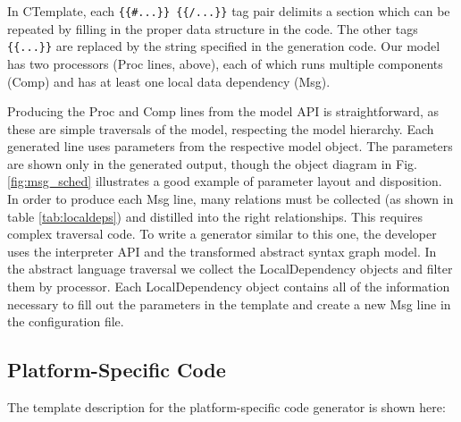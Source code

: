In CTemplate, each \verb${{#...}} {{/...}}$ tag pair delimits a section which
can be repeated by filling in the proper data structure in the code.  The other
tags \verb${{...}}$ are replaced by the string specified in the generation
code. Our model has two processors (Proc lines, above), each of which runs
multiple components (Comp) and has at least one local data dependency (Msg).

Producing the Proc and Comp lines from the model API is straightforward,
as these are simple traversals of the model, respecting the model hierarchy. 
Each generated line uses parameters from the respective model object. 
The parameters are shown only in the generated output, though the object diagram in 
Fig. \ref{fig:msg_sched} illustrates a good example of parameter layout and disposition. 
In order to produce each Msg line, many relations must be collected (as shown 
in table \ref{tab:localdeps}) and distilled into the right relationships.  
This requires complex traversal code.  To write a generator similar to this one, the developer uses the 
interpreter API and the transformed abstract syntax graph model.  In the abstract language
traversal we collect the LocalDependency objects and filter them by processor. 
Each LocalDependency object contains all of the information necessary to fill
out the parameters in the template and create a new Msg line in the
configuration file.

\subsection{Platform-Specific Code}

The template description for the platform-specific code generator is shown here:

